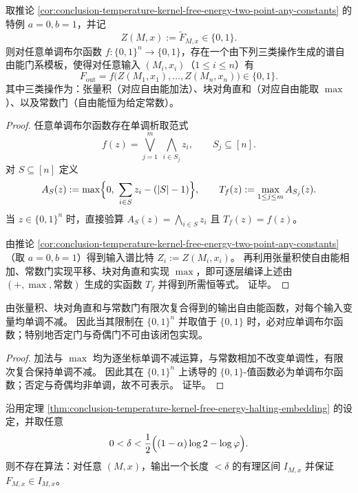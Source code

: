 \begin{theorem}[谱自由能门系对单调布尔逻辑的完备嵌入]\label{thm:conclusion-free-energy-monotone-boolean-embedding}
取推论 \ref{cor:conclusion-temperature-kernel-free-energy-two-point-any-constants} 的特例 \(a=0,b=1\)，并记
\[
Z(M,x):=\widetilde F_{M,x}\in\{0,1\}.
\]
则对任意单调布尔函数 \(f:\{0,1\}^n\to\{0,1\}\)，存在一个由下列三类操作生成的谱自由能门系模板，使得对任意输入 \((M_i,x_i)\)（\(1\le i\le n\)）有
\[
F_{\mathrm{out}}=f\bigl(Z(M_1,x_1),\dots,Z(M_n,x_n)\bigr)\in\{0,1\}.
\]
其中三类操作为：张量积（对应自由能加法）、块对角直和（对应自由能取 \(\max\)）、以及常数门（自由能恒为给定常数）。
\end{theorem}
\begin{proof}
任意单调布尔函数存在单调析取范式
\[
f(z)=\bigvee_{j=1}^{m}\ \bigwedge_{i\in S_j} z_i,
\qquad S_j\subseteq[n].
\]
对 \(S\subseteq[n]\) 定义
\[
A_S(z):=\max\Bigl\{0,\ \sum_{i\in S}z_i-(|S|-1)\Bigr\},
\qquad
T_f(z):=\max_{1\le j\le m}A_{S_j}(z).
\]
当 \(z\in\{0,1\}^n\) 时，直接验算 \(A_S(z)=\bigwedge_{i\in S}z_i\) 且 \(T_f(z)=f(z)\)。
\par
由推论 \ref{cor:conclusion-temperature-kernel-free-energy-two-point-any-constants}（取 \(a=0,b=1\)）得到输入谱比特 \(Z_i:=Z(M_i,x_i)\)。
再利用张量积使自由能相加、常数门实现平移、块对角直和实现 \(\max\)，即可逐层编译上述由 \((+,\max,\text{常数})\) 生成的实函数 \(T_f\) 并得到所需恒等式。
证毕。
\end{proof}

\begin{proposition}[谱自由能门系的单调性障碍]\label{prop:conclusion-free-energy-gates-monotonicity-obstruction}
由张量积、块对角直和与常数门有限次复合得到的输出自由能函数，对每个输入变量均单调不减。
因此当其限制在 \(\{0,1\}^n\) 并取值于 \(\{0,1\}\) 时，必对应单调布尔函数；特别地否定门与奇偶门不可由该闭包实现。
\end{proposition}
\begin{proof}
加法与 \(\max\) 均为逐坐标单调不减运算，与常数相加不改变单调性，有限次复合保持单调不减。
因此其在 \(\{0,1\}^n\) 上诱导的 \(\{0,1\}\)-值函数必为单调布尔函数；否定与奇偶均非单调，故不可表示。
证毕。
\end{proof}



\begin{corollary}[谱自由能的高精度近似不可判定]\label{cor:conclusion-temperature-kernel-free-energy-nonapproximable}
沿用定理 \ref{thm:conclusion-temperature-kernel-free-energy-halting-embedding} 的设定，并取任意
\[
0<\delta<\frac12\Bigl((1-\alpha)\log 2-\log\varphi\Bigr).
\]
则不存在算法：对任意 \((M,x)\)，输出一个长度 \(<\delta\) 的有理区间 \(I_{M,x}\) 并保证 \(F_{M,x}\in I_{M,x}\)。
\end{corollary}

